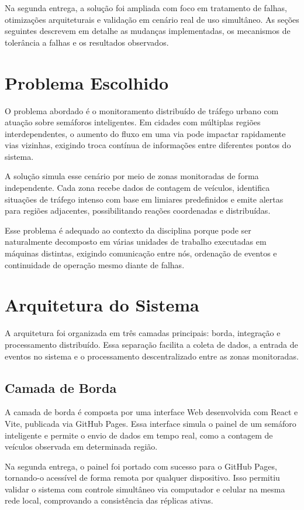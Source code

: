 \documentclass[12pt]{article}
\begin{document}
Na segunda entrega, a solução foi ampliada com foco em tratamento de falhas, otimizações arquiteturais e validação em cenário real de uso simultâneo. As seções seguintes descrevem em detalhe as mudanças implementadas, os mecanismos de tolerância a falhas e os resultados observados.

\section{Problema Escolhido}

O problema abordado é o monitoramento distribuído de tráfego urbano com atuação sobre semáforos inteligentes. Em cidades com múltiplas regiões interdependentes, o aumento do fluxo em uma via pode impactar rapidamente vias vizinhas, exigindo troca contínua de informações entre diferentes pontos do sistema.

A solução simula esse cenário por meio de zonas monitoradas de forma independente. Cada zona recebe dados de contagem de veículos, identifica situações de tráfego intenso com base em limiares predefinidos e emite alertas para regiões adjacentes, possibilitando reações coordenadas e distribuídas.

Esse problema é adequado ao contexto da disciplina porque pode ser naturalmente decomposto em várias unidades de trabalho executadas em máquinas distintas, exigindo comunicação entre nós, ordenação de eventos e continuidade de operação mesmo diante de falhas.

\section{Arquitetura do Sistema}

A arquitetura foi organizada em três camadas principais: borda, integração e processamento distribuído. Essa separação facilita a coleta de dados, a entrada de eventos no sistema e o processamento descentralizado entre as zonas monitoradas.

\subsection{Camada de Borda}

A camada de borda é composta por uma interface Web desenvolvida com React e Vite, publicada via GitHub Pages. Essa interface simula o painel de um semáforo inteligente e permite o envio de dados em tempo real, como a contagem de veículos observada em determinada região.

Na segunda entrega, o painel foi portado com sucesso para o GitHub Pages, tornando-o acessível de forma remota por qualquer dispositivo. Isso permitiu validar o sistema com controle simultâneo via computador e celular na mesma rede local, comprovando a consistência das réplicas ativas.
\end{document}
